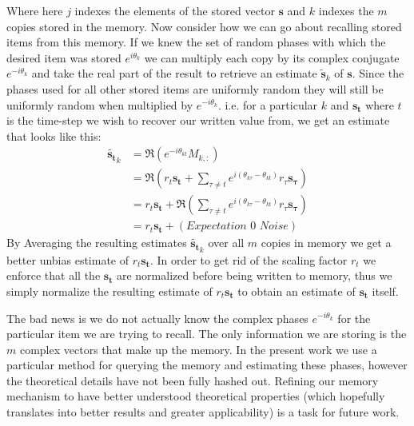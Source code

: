 \documentclass{article}
\begin{document}
Where here $j$ indexes the elements of the stored vector $\pmb{s}$ and $k$ indexes the $m$ copies stored in the memory. Now consider how we can go about recalling stored items from this memory. If we knew the set of random phases with which the desired item was stored $e^{i\theta_k}$ we can multiply each copy by its complex conjugate $e^{-i\theta_k}$ and take the real part of the result to retrieve an estimate $\tilde{\pmb{s}}_k$ of $\pmb{s}$. Since the phases used for all other stored items are uniformly random they will still be uniformly random when multiplied by $e^{-i\theta_k}$. i.e. for a particular $k$ and $\pmb{s_t}$ where $t$ is the time-step we wish to recover our written value from, we get an estimate that looks like this:
\begin{align*}
\tilde{\pmb{s_t}}_{k}&=\Re(e^{-i\theta_{kt}}M_{k,:})\\
&=\Re(r_t\pmb{s_t}+\sum_{\tau\neq t}e^{i(\theta_{k\tau}-\theta_{kt})}r_\tau\pmb{s_\tau})\\
&=r_t\pmb{s_t}+\Re(\sum_{\tau\neq t}e^{i(\theta_{k\tau}-\theta_{kt})}r_\tau\pmb{s_\tau})\\
&=r_t\pmb{s_t}+(\textit{Expectation 0 Noise})
\end{align*}
By Averaging the resulting estimates $\tilde{\pmb{s_t}}_{k}$ over all $m$ copies in memory we get a better unbias estimate of $r_t\pmb{s_t}$. In order to get rid of the scaling factor $r_t$ we enforce that all the $\pmb{s_t}$ are normalized before being written to memory, thus we simply normalize the resulting estimate of $r_t\pmb{s_t}$ to obtain an estimate of $\pmb{s_t}$ itself.

The bad news is we do not actually know the complex phases $e^{-i\theta_k}$ for the particular item we are trying to recall. The only information we are storing is the $m$ complex vectors that make up the memory. In the present work we use a particular method for querying the memory and estimating these phases, however the theoretical details have not been fully hashed out. Refining our memory mechanism to have better understood theoretical properties (which hopefully translates into better results and greater applicability) is a task for future work.
\end{document}
